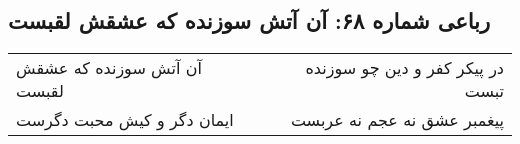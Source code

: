 \begin{center}
\section*{رباعی شماره ۶۸: آن آتش سوزنده که عشقش لقبست}
\label{sec:sh068}
\begin{longtable}{l p{0.5cm} r}
آن آتش سوزنده که عشقش لقبست
&&
در پیکر کفر و دین چو سوزنده تبست
\\
ایمان دگر و کیش محبت دگرست
&&
پیغمبر عشق نه عجم نه عربست
\\
\end{longtable}
\end{center}
